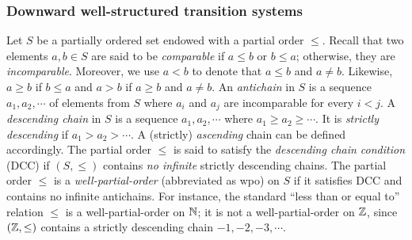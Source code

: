 
\subsubsection{Downward well-structured transition systems}


Let $S$ be a partially ordered set endowed with a partial order $\leq$. Recall that two elements $a,b\in S$ are said to be \emph{comparable} if $a\leq b$ or $b\leq a$; otherwise, they are \emph{incomparable}.
Moreover, we use $a < b$ to denote that $a \leq b$ and $a \neq b$. Likewise, $a \geq b$ if $b \leq a$ and $a > b$ if $a \geq b$ and $a \neq b$.
%
An \emph{antichain} in $S$ is a sequence $a_1, a_2, \cdots$ of elements from $S$ where $a_i$ and $a_j$ are incomparable for every $ i < j$.
A \emph{descending chain} in $S$ is a sequence $a_1, a_2, \cdots$ where $a_1 \geq a_2 \geq \cdots$. It is \emph{strictly descending} if $a_1 > a_2 > \cdots$. 
A (strictly) \emph{ascending} chain can be defined accordingly.  
%
The partial order $\leq$ is said to satisfy %
the \emph{descending chain condition} (DCC) if $(S, \leq)$ contains \emph{no infinite} strictly descending chains.
The partial order $\leq$ is a \emph{well-partial-order} (abbreviated as wpo) on $S$ if it satisfies DCC and contains no infinite antichains.  For instance, the standard ``less than or equal to'' relation $\leq$ is a well-partial-order on $\mathbb{N}$; it is not a well-partial-order on $\mathbb{Z}$, since $(\mathbb{Z}, \leq)$ contains a strictly descending chain $-1, -2, -3, \cdots$. 



